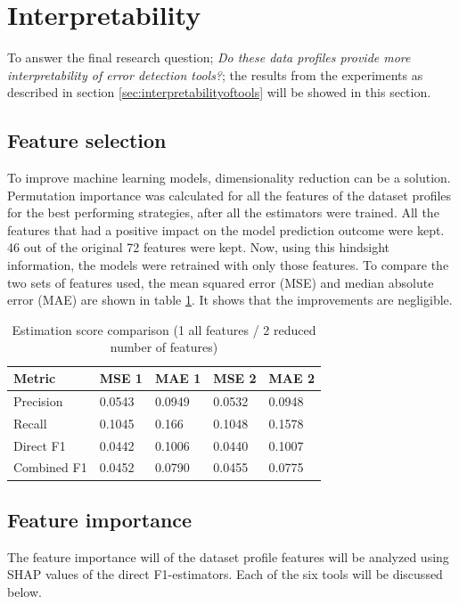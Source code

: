 \newpage
\section{Interpretability}
To answer the final research question; \textit{Do these data profiles provide more interpretability of error detection tools?}; the results from the experiments as described in section \ref{sec:interpretabilityoftools} will be showed in this section.

\subsection{Feature selection}
To improve machine learning models, dimensionality reduction can be a solution. Permutation importance was calculated for all the features of the dataset profiles for the best performing strategies, after all the estimators were trained. All the features that had a positive impact on the model prediction outcome were kept. 46 out of the original 72 features were kept. Now, using this hindsight information, the models were retrained with only those features. To compare the two sets of features used, the mean squared error (MSE) and median absolute error (MAE) are shown in table \ref{tab:improvements_feature_selection}. It shows that the improvements are negligible.

\begin{table}[h]
\centering
\begin{tabular}{l|ll|ll}
\textbf{Metric} & \textbf{MSE 1} & \textbf{MAE 1} & \textbf{MSE 2} & \textbf{MAE 2} \\ \hline
Precision       & 0.0543         & 0.0949         & 0.0532         & 0.0948         \\
Recall          & 0.1045         & 0.166          & 0.1048         & 0.1578         \\
Direct F1       & 0.0442         & 0.1006         & 0.0440         & 0.1007         \\
Combined F1     & 0.0452         & 0.0790         & 0.0455         & 0.0775        
\end{tabular}
\caption{Estimation score comparison (1 all features / 2 reduced number of features)}
\label{tab:improvements_feature_selection}
\end{table}


\subsection{Feature importance}
The feature importance will of the dataset profile features will be analyzed using SHAP values of the direct F1-estimators. Each of the six tools will be discussed below.

